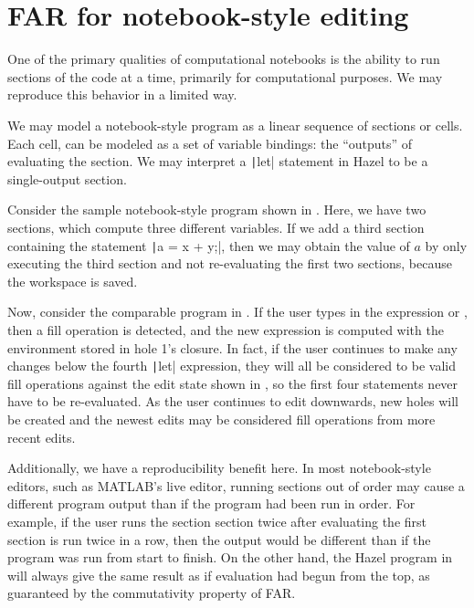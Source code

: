 \section{FAR for notebook-style editing}
\label{sec:notebook-ui}

One of the primary qualities of computational notebooks is the ability to run sections of the code at a time, primarily for computational purposes. We may reproduce this behavior in a limited way.

We may model a notebook-style program as a linear sequence of sections or cells. Each cell, can be modeled as a set of variable bindings: the ``outputs'' of evaluating the section. We may interpret a \texttt|let| statement in Hazel to be a single-output section.

Consider the sample notebook-style program shown in . Here, we have two sections, which compute three different variables. If we add a third section containing the statement \texttt|a = x + y;|, then we may obtain the value of $a$ by only executing the third section and not re-evaluating the first two sections, because the workspace is saved.

Now, consider the comparable program in . If the user types in the expression  or , then a fill operation is detected, and the new expression is computed with the environment stored in hole 1's closure. In fact, if the user continues to make any changes below the fourth \texttt|let| expression, they will all be considered to be valid fill operations against the edit state shown in , so the first four statements never have to be re-evaluated. As the user continues to edit downwards, new holes will be created and the newest edits may be considered fill operations from more recent edits.

Additionally, we have a reproducibility benefit here. In most notebook-style editors, such as MATLAB's live editor, running sections out of order may cause a different program output than if the program had been run in order. For example, if the user runs the section section twice after evaluating the first section  is run twice in a row, then the output would be different than if the program was run from start to finish. On the other hand, the Hazel program in  will always give the same result as if evaluation had begun from the top, as guaranteed by the commutativity property of FAR.

